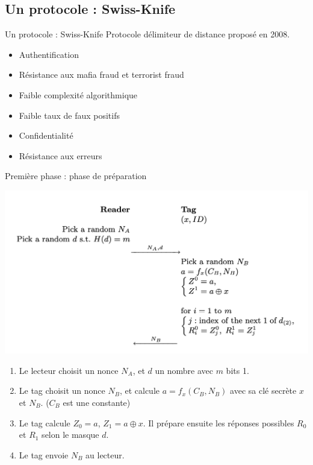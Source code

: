\documentclass[aspectratio=169]{beamer}
\begin{document}
\subsection{Un protocole : Swiss-Knife}

\begin{frame}{Un protocole : Swiss-Knife}
  Protocole délimiteur de distance proposé en 2008. \cite{SwissKnife}

  \bigskip

  \begin{itemize}
    \item Authentification
    \item Résistance aux mafia fraud et terrorist fraud
    \item Faible complexité algorithmique
    \item Faible taux de faux positifs
    \item Confidentialité
    \item Résistance aux erreurs
  \end{itemize}

\end{frame}


\begin{frame}{Première phase : phase de préparation}
  \begin{multicols}{2}
    \begin{minipage}[c]{\linewidth}
      \centering
      \bigskip
      \medskip
      \includegraphics[width=\linewidth]{assets/sk-phase1.png}
    \end{minipage}

    \begin{minipage}[t]{\linewidth}
      \begin{enumerate}
        \item Le lecteur choisit un nonce $N_A$, et $d$ un nombre avec $m$ bits 1.
        \item Le tag choisit un nonce $N_B$, et calcule $a = f_x(C_B, N_B)$ avec sa clé secrète $x$ et $N_B$. ($C_B$ est une constante)
        \item Le tag calcule $Z_0 = a$, $Z_1 = a \oplus x$. Il prépare ensuite les réponses possibles $R_0$ et $R_1$ selon le masque $d$.
        \item Le tag envoie $N_B$ au lecteur.
      \end{enumerate}
    \end{minipage}
  \end{multicols}
\end{frame}
\end{document}
